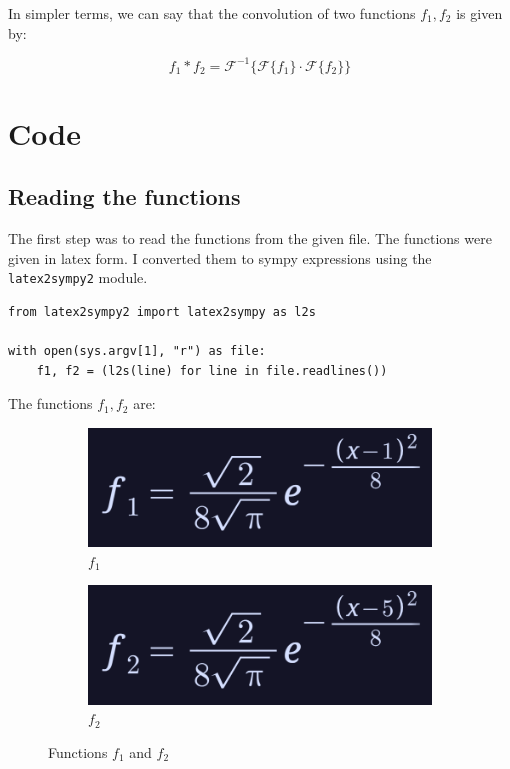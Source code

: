 \documentclass[12pt]{report}
\begin{document}
In simpler terms, we can say that the convolution of two functions $f_1, f_2$ is given by:

$$f_1 \ast f_2 = \mathcal{F}^{-1} \{\mathcal{F}\{f_1\}\cdot\mathcal{F}\{f_2\}\}$$

\section{Code}

\subsection{Reading the functions}
The first step was to read the functions from the given file. The functions were given in latex form. I converted them to sympy expressions using the \texttt{latex2sympy2} module.

\begin{lstlisting}[caption={Reading the functions}]
from latex2sympy2 import latex2sympy as l2s

with open(sys.argv[1], "r") as file:
    f1, f2 = (l2s(line) for line in file.readlines())
\end{lstlisting}

The functions $f_1, f_2$ are:

\begin{figure}[H]
    \centering
    \begin{subfigure}{0.45\textwidth}
        \centering
        \includegraphics[width=\linewidth]{f1.png}
        \caption{$f_1$}
        \label{fig:f1}
    \end{subfigure}
    \begin{subfigure}{0.45\textwidth}
        \centering
        \includegraphics[width=\linewidth]{f2.png}
        \caption{$f_2$}
        \label{fig:f2}
    \end{subfigure}
    \caption{Functions $f_1$ and $f_2$}
    \label{fig:f1_f2}
\end{figure}
\end{document}
